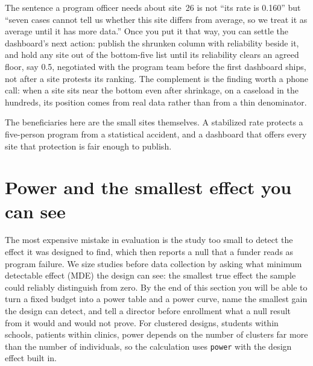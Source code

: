 \documentclass[
    a4paper,
    fontsize=10pt,
    twoside=true,
    numbers=noenddot,
]{kaobook}
\begin{document}
The sentence a program officer needs about site~26 is not \enquote{its rate is 0.160} but \enquote{seven cases cannot tell us whether this site differs from average, so we treat it as average until it has more data.} Once you put it that way, you can settle the dashboard's next action: publish the shrunken column with reliability beside it, and hold any site out of the bottom-five list until its reliability clears an agreed floor, say 0.5, negotiated with the program team before the first dashboard ships, not after a site protests its ranking. The complement is the finding worth a phone call: when a site sits near the bottom even after shrinkage, on a caseload in the hundreds, its position comes from real data rather than from a thin denominator.

The beneficiaries here are the small sites themselves. A stabilized rate protects a five-person program from a statistical accident, and a dashboard that offers every site that protection is fair enough to publish.

\section{Power and the smallest effect you can see}\label{sec:mde}
The most expensive mistake in evaluation is the study too small to detect the effect it was designed to find, which then reports a null that a funder reads as program failure. We size studies before data collection by asking what minimum detectable effect (MDE) the design can see: the smallest true effect the sample could reliably distinguish from zero. By the end of this section you will be able to turn a fixed budget into a power table and a power curve, name the smallest gain the design can detect, and tell a director before enrollment what a null result from it would and would not prove. For clustered designs, students within schools, patients within clinics, power depends on the number of clusters far more than the number of individuals, so the calculation uses \texttt{power} with the design effect built in.
\end{document}
